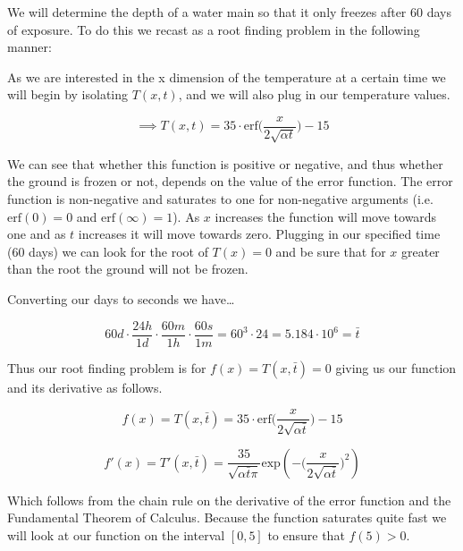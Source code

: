 \documentclass[11pt]{article}
\begin{document}
We will determine the depth of a water main so that it only freezes
after 60 days of exposure. To do this we recast as a root finding
problem in the following manner:

As we are interested in the x dimension of the temperature at a certain
time we will begin by isolating \(T(x,t)\), and we will also plug in our
temperature values.

\[ \implies T(x,t)=35\cdot\text{erf}\Big(\frac{x}{2\sqrt{\alpha t}}\Big)-15 \]

    We can see that whether this function is positive or negative, and thus
whether the ground is frozen or not, depends on the value of the error
function. The error function is non-negative and saturates to one for
non-negative arguments (i.e. \(\text{erf}(0)=0\) and
\(\text{erf}(\infty)=1\)). As \(x\) increases the function will move
towards one and as \(t\) increases it will move towards zero. Plugging
in our specified time (60 days) we can look for the root of \(T(x)=0\)
and be sure that for \(x\) greater than the root the ground will not be
frozen.

Converting our days to seconds we have\ldots{}

\[ 60d \cdot \frac{24h}{1d} \cdot \frac{60m}{1h} \cdot \frac{60s}{1m} = 60^3\cdot24 = 5.184\cdot10^6 = \bar{t} \]

Thus our root finding problem is for \(f(x)=T(x,\bar{t})=0\) giving us
our function and its derivative as follows.

\[ f(x)=T(x,\bar{t})=35\cdot\text{erf}\Big(\frac{x}{2\sqrt{\alpha\bar{t}}}\Big)-15 \]

\[ f'(x)=T'(x,\bar{t})=\frac{35}{\sqrt{\alpha\bar{t}\pi}}\text{exp}(-\Big(\frac{x}{2\sqrt{\alpha\bar{t}}}\Big)^2) \]

Which follows from the chain rule on the derivative of the error
function and the Fundamental Theorem of Calculus. Because the function
saturates quite fast we will look at our function on the interval
\([0,5]\) to ensure that \(f(5)>0\).
\end{document}
